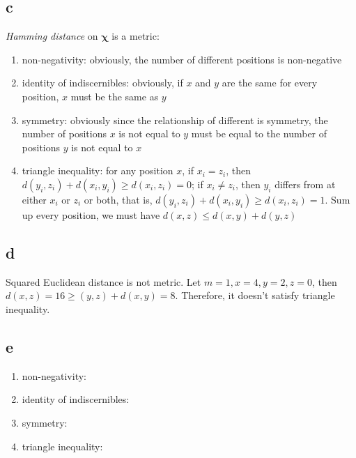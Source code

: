 \documentclass[a4paper,11pt]{article}
\theoremstyle{mytheor}
\begin{document}
\subsection*{c}
\textit{Hamming distance} on $\mathbf{\chi}$ is  a metric:
\begin{enumerate}
	\item non-negativity: obviously, the number of different positions is non-negative
	\item identity of indiscernibles: obviously, if $x$ and $y$ are the same for every position, $x$ must be the same as $y$
	\item symmetry: obviously since the relationship of different is symmetry, the number of positions $x$ is not equal to $y$ must be equal to 
	the number of positions $y$ is not equal to $x$ 
	\item triangle inequality: for any position $x$, if $x_i = z_i$, then $d(y_i,z_i) + d(x_i, y_i) \geq d(x_i, z_i) = 0$; if $x_i \neq z_i$, then
	$y_i$ differs from at either $x_i$ or $z_i$ or both, that is, $d(y_i,z_i) + d(x_i, y_i) \geq d(x_i, z_i) = 1$. Sum up every position, we must have
	$d(x,z) \leq d(x,y) + d(y,z)$
\end{enumerate}

\subsection*{d}
Squared Euclidean distance is not metric. Let $m = 1, x= 4, y= 2, z= 0$, then $d(x,z) = 16 \geq (y,z) + d(x,y) = 8$. Therefore, it doesn't satisfy 
triangle inequality. 


\subsection*{e}
\begin{enumerate}
	\item non-negativity: 
	\item identity of indiscernibles:
	\item symmetry: 
	\item triangle inequality: 
\end{enumerate}
\end{document}
